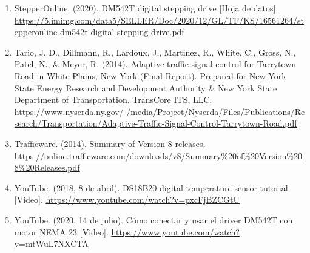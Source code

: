 \begin{enumerate}
\item
  StepperOnline. (2020). DM542T digital stepping drive {[}Hoja de datos{]}. \href{https://5.imimg.com/data5/SELLER/Doc/2020/12/GL/TF/KS/16561264/stepperonline-dm542t-digital-stepping-drive.pdf}{\ul{https://5.imimg.com/data5/SELLER/Doc/2020/12/GL/TF/KS/16561264/stepperonline-dm542t-digital-stepping-drive.pdf}}
\item
  Tario, J. D., Dillmann, R., Lardoux, J., Martinez, R., White, C., Gross, N., Patel, N., \& Meyer, R. (2014). Adaptive traffic signal control for Tarrytown Road in White Plains, New York (Final Report). Prepared for New York State Energy Research and Development Authority \& New York State Department of Transportation. TransCore ITS, LLC. \href{https://www.nyserda.ny.gov/-/media/Project/Nyserda/Files/Publications/Research/Transportation/Adaptive-Traffic-Signal-Control-Tarrytown-Road.pdf}{\ul{https://www.nyserda.ny.gov/-/media/Project/Nyserda/Files/Publications/Research/Transportation/Adaptive-Traffic-Signal-Control-Tarrytown-Road.pdf}}
\item
  Trafficware. (2014). Summary of Version 8 releases. \href{https://online.trafficware.com/downloads/v8/Summary\%20of\%20Version\%208\%20Releases.pdf}{\ul{https://online.trafficware.com/downloads/v8/Summary\%20of\%20Version\%208\%20Releases.pdf}}
\item
  YouTube. (2018, 8 de abril). DS18B20 digital temperature sensor tutorial {[}Video{]}. \href{https://www.youtube.com/watch?v=pxcFjBZCGtU}{\ul{https://www.youtube.com/watch?v=pxcFjBZCGtU}}
\item
  YouTube. (2020, 14 de julio). Cómo conectar y usar el driver DM542T con motor NEMA 23 {[}Video{]}. \href{https://www.youtube.com/watch?v=mtWuL7NXCTA}{\ul{https://www.youtube.com/watch?v=mtWuL7NXCTA}}
\end{enumerate}